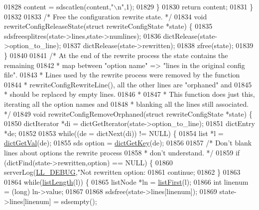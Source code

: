 \begin{DoxyCode}
{{{{{{{{{{{{{{{{{{{{{{{{{{{01828         content = sdscatlen(content,\textcolor{stringliteral}{"\(\backslash\)n"},1);
01829     \}
01830     \textcolor{keywordflow}{return} content;
01831 \}
01832 
01833 \textcolor{comment}{/* Free the configuration rewrite state. */}
01834 \textcolor{keywordtype}{void} rewriteConfigReleaseState(\textcolor{keyword}{struct} rewriteConfigState *state) \{
01835     sdsfreesplitres(state->lines,state->numlines);
01836     dictRelease(state->option\_to\_line);
01837     dictRelease(state->rewritten);
01838     zfree(state);
01839 \}
01840 
01841 \textcolor{comment}{/* At the end of the rewrite process the state contains the remaining}
01842 \textcolor{comment}{ * map between "option name" => "lines in the original config file".}
01843 \textcolor{comment}{ * Lines used by the rewrite process were removed by the function}
01844 \textcolor{comment}{ * rewriteConfigRewriteLine(), all the other lines are "orphaned" and}
01845 \textcolor{comment}{ * should be replaced by empty lines.}
01846 \textcolor{comment}{ *}
01847 \textcolor{comment}{ * This function does just this, iterating all the option names and}
01848 \textcolor{comment}{ * blanking all the lines still associated. */}
01849 \textcolor{keywordtype}{void} rewriteConfigRemoveOrphaned(\textcolor{keyword}{struct} rewriteConfigState *state) \{
01850     dictIterator *di = dictGetIterator(state->option\_to\_line);
01851     dictEntry *de;
01852 
01853     \textcolor{keywordflow}{while}((de = dictNext(di)) != NULL) \{
01854         list *l = \hyperlink{dict_8h_ae8d2cc391873b2bea2b87c4f80f43120}{dictGetVal}(de);
01855         sds option = \hyperlink{dict_8h_a3271c334309904a3086deca94f96e46e}{dictGetKey}(de);
01856 
01857         \textcolor{comment}{/* Don't blank lines about options the rewrite process}
01858 \textcolor{comment}{         * don't understand. */}
01859         \textcolor{keywordflow}{if} (dictFind(state->rewritten,option) == NULL) \{
01860             serverLog(\hyperlink{server_8h_abcaffe365dee628fcf9fc90c69d534a1}{LL\_DEBUG},\textcolor{stringliteral}{"Not rewritten option: %
01861             \textcolor{keywordflow}{continue};
01862         \}
01863 
01864         \textcolor{keywordflow}{while}(\hyperlink{adlist_8h_afde0ab079f934670e82119b43120e94b}{listLength}(l)) \{
01865             listNode *ln = \hyperlink{adlist_8h_aa8dc514bbe217bb2e87c1c77cfa84690}{listFirst}(l);
01866             \textcolor{keywordtype}{int} linenum = (\textcolor{keywordtype}{long}) ln->value;
01867 
01868             sdsfree(state->lines[linenum]);
01869             state->lines[linenum] = sdsempty();
}}}}}}}}}}}}}}}}}}}}}}}}}}}}
\end{DoxyCode}
